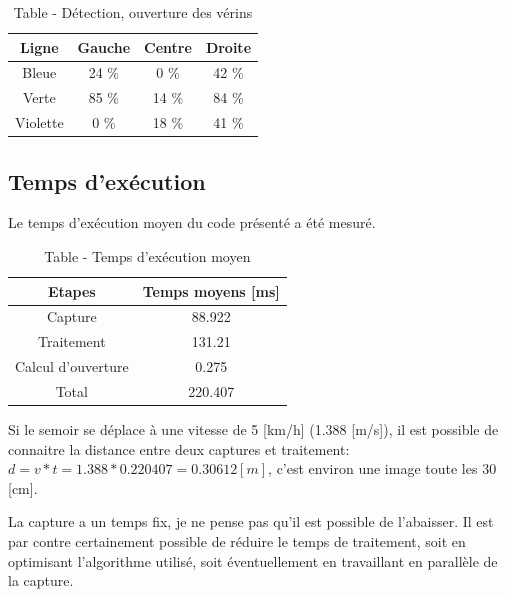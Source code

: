 \begin{table}[H]
    \begin{center}
        \caption{Table - Détection, ouverture des vérins}
        \begin{tabular}{|c|c|c|c|}
            Ligne    & Gauche & Centre & Droite \\ \hline
            Bleue    & 24 \%  & 0 \%   & 42 \%  \\
            Verte    & 85 \%  & 14 \%  & 84 \%  \\
            Violette & 0 \%   & 18 \%  & 41 \%  \\
        \end{tabular}
    \end{center}
\end{table}

\subsection{Temps d'exécution}
Le temps d'exécution moyen du code présenté a été mesuré.
\begin{table}[H]
    \begin{center}
        \caption{Table - Temps d'exécution moyen}
        \begin{tabular}{|c|c|}
            Etapes             & Temps moyens [ms] \\ \hline
            Capture            & 88.922            \\
            Traitement         & 131.21            \\
            Calcul d'ouverture & 0.275             \\ \hline
            Total              & 220.407           \\
        \end{tabular}
    \end{center}
\end{table}

Si le semoir se déplace à une vitesse de 5 [km/h] (1.388 [m/s]), il est possible de connaitre la distance entre deux captures et traitement: \(d = v * t = 1.388 * 0.220407 = 0.30612 [m] \), c'est environ une image toute les 30 [cm].

La capture a un temps fix, je ne pense pas qu'il est possible de l'abaisser. Il est par contre certainement possible de réduire le temps de traitement, soit en optimisant l'algorithme utilisé, soit éventuellement en travaillant en parallèle de la capture.